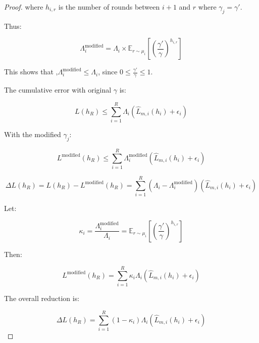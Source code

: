 \begin{proof}
where \( h_{i,r} \) is the number of rounds between \( i+1 \) and \( r \) where \( \gamma_j = \gamma' \).


Thus:

\[
\Lambda_i^{\text{modified}} = \Lambda_i \times \mathbb{E}_{r \sim \mu_i} \left[ \left( \frac{\gamma'}{\gamma} \right)^{h_{i,r}} \right]
\]

This shows that ,\( \Lambda_i^{\text{modified}} \leq \Lambda_i \), since \( 0 \leq \frac{\gamma'}{\gamma} \leq 1 \).


The cumulative error with original \( \gamma \) is:

\[
L(h_R) \leq \sum_{i=1}^{R} \Lambda_i \left( \hat{L}_{m,i}(h_i) + \epsilon_i \right)
\]


With the modified \( \gamma_j \):

\[
L^{\text{modified}}(h_R) \leq \sum_{i=1}^{R} \Lambda_i^{\text{modified}} \left( \hat{L}_{m,i}(h_i) + \epsilon_i \right)
\]



\[
\Delta L(h_R) = L(h_R) - L^{\text{modified}}(h_R) = \sum_{i=1}^{R} \left( \Lambda_i - \Lambda_i^{\text{modified}} \right) \left( \hat{L}_{m,i}(h_i) + \epsilon_i \right)
\]


Let:

\[
\kappa_i = \frac{\Lambda_i^{\text{modified}}}{\Lambda_i} = \mathbb{E}_{r \sim \mu_i} \left[ \left( \frac{\gamma'}{\gamma} \right)^{h_{i,r}} \right]
\]

Then:

\[
L^{\text{modified}}(h_R) = \sum_{i=1}^{R} \kappa_i \Lambda_i \left( \hat{L}_{m,i}(h_i) + \epsilon_i \right)
\]


The overall reduction is:

\[
\Delta L(h_R) = \sum_{i=1}^{R} \left( 1 - \kappa_i \right) \Lambda_i \left( \hat{L}_{m,i}(h_i) + \epsilon_i \right)
\]

\end{proof}


